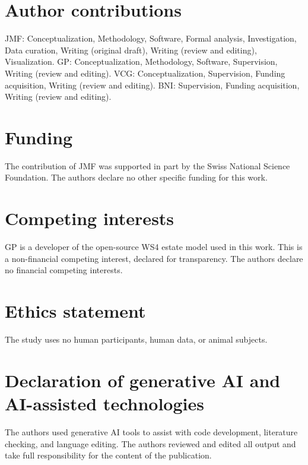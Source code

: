 \section*{Author contributions}

JMF: Conceptualization, Methodology, Software, Formal analysis, Investigation, Data curation,
Writing (original draft), Writing (review and editing), Visualization. GP: Conceptualization,
Methodology, Software, Supervision, Writing (review and editing). VCG: Conceptualization,
Supervision, Funding acquisition, Writing (review and editing). BNI: Supervision, Funding
acquisition, Writing (review and editing).

\section*{Funding}

The contribution of JMF was supported in part by the Swiss National Science Foundation. The authors
declare no other specific funding for this work.

\section*{Competing interests}

GP is a developer of the open-source WS4 estate model used in this work. This is a non-financial
competing interest, declared for transparency.
The authors declare no financial competing interests.

\section*{Ethics statement}

The study uses no human participants, human data, or animal subjects.

\section*{Declaration of generative AI and AI-assisted technologies}

The authors used generative AI tools to assist with code development, literature checking, and
language editing. The authors reviewed and edited all output and take full responsibility for the
content of the publication.
